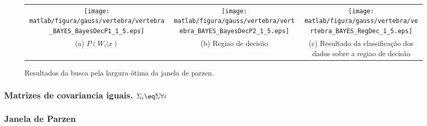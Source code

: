 \documentclass[ 
	article,			%
	11pt,				%
	oneside,			%
	a4paper,			%
	english,			%
	brazil,				%
	]{abntex2}
\begin{document}
\begin{figure}
\begin{tabular}{ccc}
      \texttt{[image: matlab/figura/gauss/vertebra/vertebra\_BAYES\_BayesDecP1\_1\_5.eps]}
      &
	  \texttt{[image: matlab/figura/gauss/vertebra/vertebra\_BAYES\_BayesDecP2\_1\_5.eps]}
	  &
	  \texttt{[image: matlab/figura/gauss/vertebra/vertebra\_BAYES\_RegDec\_1\_5.eps]}
	  \\		  	  
	 \multicolumn{1}{p{40mm}}{(a) $P(W_i|x)$}
	 &
	 \multicolumn{1}{p{40mm}}{(b) Regiao de decisão}
	 &
	 \multicolumn{1}{p{40mm}}{(c) Resultado
	 da classificação dos dados sobre a regiao de decisão}
	 
	 
	\end{tabular}
	\caption{Resultados da busca pela largura ótima da janela de parzen.}

\end{figure}




\subsubsection{ Matrizes de covariancia iguais. $\Sigma_i \eq \Sigma \forall i$}

\subsubsection{Janela de Parzen}
\end{document}
